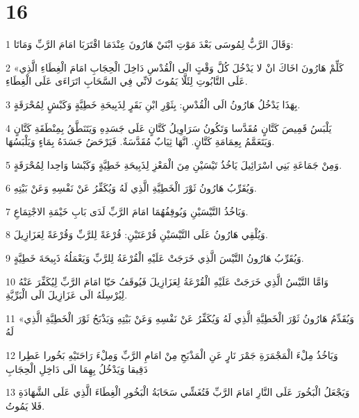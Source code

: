 \chapter{16}

\par 1 وَقَالَ الرَّبُّ لِمُوسَى بَعْدَ مَوْتِ ابْنَيْ هَارُونَ عِنْدَمَا اقْتَرَبَا امَامَ الرَّبِّ وَمَاتَا:
\par 2 «كَلِّمْ هَارُونَ اخَاكَ انْ لا يَدْخُلَ كُلَّ وَقْتٍ الَى الْقُدْسِ دَاخِلَ الْحِجَابِ امَامَ الْغِطَاءِ الَّذِي عَلَى التَّابُوتِ لِئَلَّا يَمُوتَ لانِّي فِي السَّحَابِ اتَرَاءَى عَلَى الْغِطَاءِ.
\par 3 بِهَذَا يَدْخُلُ هَارُونُ الَى الْقُدْسِ: بِثَوْرِ ابْنِ بَقَرٍ لِذَبِيحَةِ خَطِيَّةٍ وَكَبْشٍ لِمُحْرَقَةٍ.
\par 4 يَلْبَسُ قَمِيصَ كَتَّانٍ مُقَدَّسا وَتَكُونُ سَرَاوِيلُ كَتَّانٍ عَلَى جَسَدِهِ وَيَتَنَطَّقُ بِمِنْطَقَةِ كَتَّانٍ وَيَتَعَمَّمُ بِعِمَامَةِ كَتَّانٍ. انَّهَا ثِيَابٌ مُقَدَّسَةٌ. فَيَرْحَضُ جَسَدَهُ بِمَاءٍ وَيَلْبَسُهَا.
\par 5 وَمِنْ جَمَاعَةِ بَنِي اسْرَائِيلَ يَاخُذُ تَيْسَيْنِ مِنَ الْمَعْزِ لِذَبِيحَةِ خَطِيَّةٍ وَكَبْشا وَاحِدا لِمُحْرَقَةٍ.
\par 6 وَيُقَرِّبُ هَارُونُ ثَوْرَ الْخَطِيَّةِ الَّذِي لَهُ وَيُكَفِّرُ عَنْ نَفْسِهِ وَعَنْ بَيْتِهِ.
\par 7 وَيَاخُذُ التَّيْسَيْنِ وَيُوقِفُهُمَا امَامَ الرَّبِّ لَدَى بَابِ خَيْمَةِ الاجْتِمَاعِ.
\par 8 وَيُلْقِي هَارُونُ عَلَى التَّيْسَيْنِ قُرْعَتَيْنِ: قُرْعَةً لِلرَّبِّ وَقُرْعَةً لِعَزَازِيلَ.
\par 9 وَيُقَرِّبُ هَارُونُ التَّيْسَ الَّذِي خَرَجَتْ عَلَيْهِ الْقُرْعَةُ لِلرَّبِّ وَيَعْمَلُهُ ذَبِيحَةَ خَطِيَّةٍ.
\par 10 وَامَّا التَّيْسُ الَّذِي خَرَجَتْ عَلَيْهِ الْقُرْعَةُ لِعَزَازِيلَ فَيُوقَفُ حَيّا امَامَ الرَّبِّ لِيُكَفِّرَ عَنْهُ لِيُرْسِلَهُ الَى عَزَازِيلَ الَى الْبَرِّيَّةِ.
\par 11 «وَيُقَدِّمُ هَارُونُ ثَوْرَ الْخَطِيَّةِ الَّذِي لَهُ وَيُكَفِّرُ عَنْ نَفْسِهِ وَعَنْ بَيْتِهِ وَيَذْبَحُ ثَوْرَ الْخَطِيَّةِ الَّذِي لَهُ
\par 12 وَيَاخُذُ مِلْءَ الْمَجْمَرَةِ جَمْرَ نَارٍ عَنِ الْمَذْبَحِ مِنْ امَامِ الرَّبِّ وَمِلْءَ رَاحَتَيْهِ بَخُورا عَطِرا دَقِيقا وَيَدْخُلُ بِهِمَا الَى دَاخِلِ الْحِجَابِ
\par 13 وَيَجْعَلُ الْبَخُورَ عَلَى النَّارِ امَامَ الرَّبِّ فَتُغَشِّي سَحَابَةُ الْبَخُورِ الْغِطَاءَ الَّذِي عَلَى الشَّهَادَةِ فَلا يَمُوتُ.
